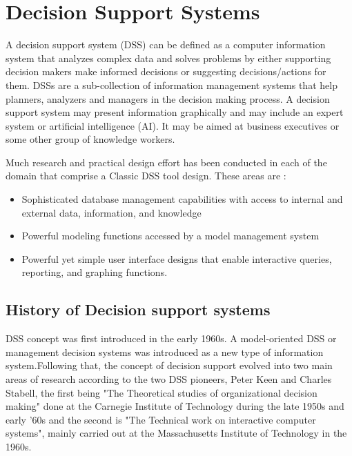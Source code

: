 \chapter{Decision Support Systems}
\renewcommand\textbullet{\ensuremath{\bullet}}
\label{ChapterTwo}
\indent A decision support system (DSS) can be defined as a computer information system that analyzes complex data and solves problems by either supporting decision makers make informed decisions or suggesting decisions/actions for them.\cite{shim2002past} DSSs are a sub-collection of information management systems that help planners, analyzers and managers in the decision making process.\cite{khodashahri2013decision} A decision support system may present information graphically and may include an expert system or artificial intelligence (AI). It may be aimed at business executives or some other group of knowledge workers.

\indent Much research and practical design effort has been conducted in each of the domain that comprise a Classic DSS tool design. These areas are \cite{shim2002past}:
\begin{itemize}
	\item Sophisticated database management capabilities with access to internal and external data, information, and knowledge
	\item Powerful modeling functions accessed by a model management system
	\item Powerful yet simple user interface designs that enable interactive queries, reporting, and graphing functions.
\end{itemize}
\section{History of Decision support systems}
\label{sec:HistoryOfDecisionSupportSystems}
\indent DSS concept was first introduced in the early 1960s.\cite{power2007brief} A model-oriented DSS or management decision systems was introduced as a new type of information system.Following that, the concept of decision support evolved into two main areas of research according to the two DSS pioneers, Peter Keen and Charles Stabell, the first being "The Theoretical studies of organizational decision making" done at the Carnegie Institute of Technology during the late 1950s and early '60s and the second is "The Technical work on interactive computer systems", mainly carried out at the Massachusetts Institute of Technology in the 1960s.\cite{power2007brief}\cite{shim2002past}

